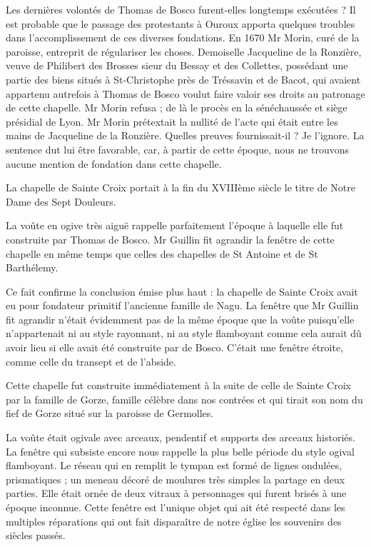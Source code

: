 Les dernières volontés de Thomas de Bosco furent-elles longtemps exécutées ? Il est probable que le passage des protestants à Ouroux apporta quelques troubles dans l'accomplissement de ces diverses fondations. En 1670 Mr Morin, curé de la paroisse, entreprit de régulariser les choses. Demoiselle Jacqueline de la Ronzière, veuve de Philibert des Brosses sieur du Bessay et des Collettes, possédant une partie des biens situés à St-Christophe près de Tréssavin et de Bacot, qui avaient appartenu autrefois à Thomas de Bosco voulut faire valoir ses droits au patronage de cette chapelle. Mr Morin refusa ; de là le procès en la sénéchaussée et siège présidial de Lyon. Mr Morin prétextait la nullité de l'acte qui était entre les mains de Jacqueline de la Ronzière. Quelles preuves fournissait-il ? Je l'ignore. La sentence dut lui être favorable, car, à partir de cette époque, nous ne trouvons aucune mention de fondation dans cette chapelle.

La chapelle de Sainte Croix portait à la fin du XVIIIème siècle le titre de Notre Dame des Sept Douleurs.

La voûte en ogive très aiguë rappelle parfaitement l'époque à laquelle elle fut construite par Thomas de Bosco. Mr Guillin fit agrandir la fenêtre de cette chapelle en même temps que celles des chapelles de St Antoine et de St Barthélemy.

Ce fait confirme la conclusion émise plus haut : la chapelle de Sainte Croix avait eu pour fondateur primitif l'ancienne famille de Nagu. La fenêtre que Mr Guillin fit agrandir n'était évidemment pas de la même époque que la voûte puisqu'elle n'appartenait ni au style rayonnant, ni au style flamboyant comme cela aurait dû avoir lieu si elle avait été construite par de Bosco. C'était une fenêtre étroite, comme celle du transept et de l'abside.

Cette chapelle fut construite immédiatement à la suite de celle de Sainte Croix par la famille de Gorze, famille célèbre dans nos contrées et qui tirait son nom du fief de Gorze situé sur la paroisse de Germolles.

La voûte était ogivale avec arceaux, pendentif et supports des arceaux historiés. La fenêtre qui subsiste encore nous rappelle la plus belle période du style ogival flamboyant. Le réseau qui en remplit le tympan est formé de lignes ondulées, prismatiques ; un meneau décoré de moulures très simples la partage en deux parties. Elle était ornée de deux vitraux à personnages qui furent brisés à une époque inconnue. Cette fenêtre est l'unique objet qui ait été respecté dans les multiples réparations qui ont fait disparaître de notre église les souvenirs des siècles passés.

